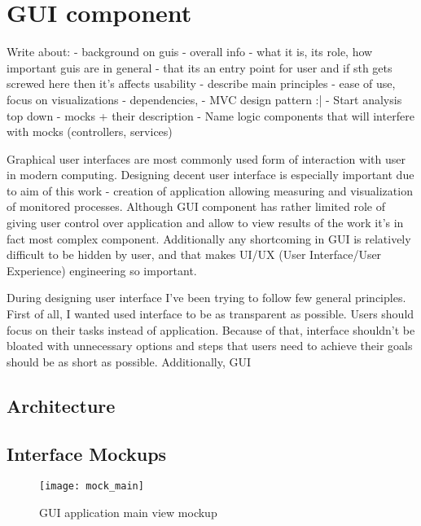  
%


\section{GUI component}
\label{sec:arch_gui}

Write about:
- background on guis
- overall info - what it is, its role, how important guis are in general - that its an entry point for user and if sth
gets screwed here then it's affects usability 
- describe main principles - ease of use, focus on visualizations 
- dependencies,
- MVC design pattern :|
- Start analysis top down - mocks + their description
- Name logic components that will interfere with mocks (controllers, services)

Graphical user interfaces are most commonly used form of interaction with user in modern computing. Designing decent
user interface is especially important due to aim of this work - creation of application allowing measuring and
visualization of monitored processes. Although GUI component has rather limited role of giving user control over
application and allow to view results of the work it's in fact most complex component. Additionally any shortcoming in
GUI is relatively difficult to be hidden by user, and that makes UI/UX (User Interface/User Experience) engineering so
important.

During designing user interface I've been trying to follow few general principles. First of all, I wanted used
interface to be as transparent as possible. Users should focus on their tasks instead of application. Because of that,
interface shouldn't be bloated with unnecessary options and steps that users need to achieve their goals should be as
short as possible. Additionally, GUI 
 


\subsection{Architecture}

\subsection{Interface Mockups}

\begin{figure}[h]
  \centering
  \texttt{[image: mock\_main]}
  \caption{GUI application main view mockup}
  \label{fig:arch_overall}
\end{figure}


